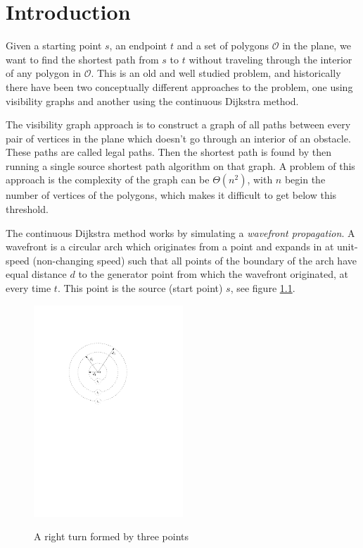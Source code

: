 \chapter{Introduction} 
Given a starting point $s$, an endpoint $t$ and a set of
polygons $\mathcal{O}$ in the plane, we want to find the shortest path from $s$ to $t$ 
without traveling through the interior of any polygon in $\mathcal{O}$. 
This is an old and well studied problem, and historically there have been two
conceptually different approaches to the problem, one using visibility graphs and
another using the continuous Dijkstra method. 

The visibility graph approach is to construct a graph of all paths between every pair 
of vertices in the plane which doesn't go through an interior of an obstacle. 
These paths are called legal paths. Then the shortest path is found by then running a 
single source shortest path algorithm on that graph. A problem of this approach
is the complexity of the graph can be $\Theta(n^2)$, with $n$ begin the number of vertices of the polygons,
which makes it difficult to get below this threshold. 

The continuous Dijkstra method works by simulating a \emph{wavefront propagation}.
A wavefront is a circular arch which originates from a point and expands in at unit-speed
(non-changing speed) such that all points of the boundary of the arch have equal distance 
$d$ to the generator point from which the wavefront originated, at every time $t$. 
This point is the source (start point) $s$, see figure \ref{fig:simplewavefront}.

\begin{figure}[H]
    \centering
	\includegraphics[width=0.5\textwidth]{figures/simplewavefront.pdf}
	\label{fig:simplewavefront}
	\caption{A right turn formed by three points}
\end{figure}

